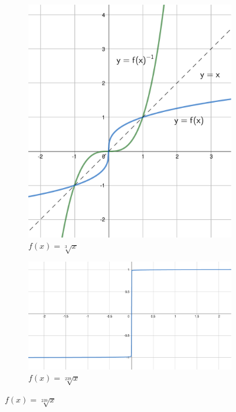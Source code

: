 \begin{figure}[h]
    \centering
    \begin{subfigure}{0.35\textwidth}
        \includegraphics[width=\textwidth]{tex/chapter_2/assets/y=x^(1_div_by_3).pdf}
        \caption*{$f(x) = \sqrt[3]{x}$}
    \end{subfigure}
    \hfill
    \begin{subfigure}{0.5\textwidth}
        \includegraphics[width=\textwidth]{tex/chapter_2/assets/y=x^(1_div_by_239).pdf}
        \caption*{$f(x) = \sqrt[239]{x}$}
    \end{subfigure}
\end{figure}

